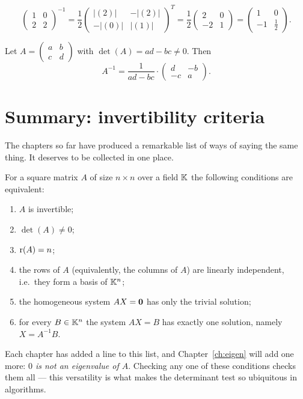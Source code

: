 \begin{example}
\[
\left ( \begin{array}{cc} 1 & 0 \\ 2 & 2 \end{array} \right )^{-1}
= \frac{1}{2} \left ( \begin{array}{cc}
|(2)| & -|(2)| \\ -|(0)| & |(1)|
\end{array} \right )^T
= \frac{1}{2} \left ( \begin{array}{cc} 2 & 0 \\ -2 & 1 \end{array} \right )
= \left ( \begin{array}{cc} 1 & 0 \\ -1 & \tfrac12 \end{array} \right ).
\]
\end{example}

\begin{fact}
Let $A= \left ( \begin{smallmatrix} a & b \\ c & d \end{smallmatrix} \right )$ with
$\det(A) = ad-bc \neq 0$. Then
\[
A^{-1} = \frac{1}{ad-bc}\cdot \left( \begin{array}{cc} d & -b \\ -c & a \end{array} \right ).
\]
\end{fact}

\section{Summary: invertibility criteria}

The chapters so far have produced a remarkable list of ways of saying the same thing. It deserves to be
collected in one place.

\begin{theorem}
For a square matrix $A$ of size $n\times n$ over a field $\mathbb{K}$ the following conditions are equivalent:
\begin{enumerate}
\item $A$ is invertible;
\item $\det(A)\neq 0$;
\item $\operatorname{r}(A) = n$;
\item the rows of $A$ (equivalently, the columns of $A$) are linearly independent, i.e.\ they form a basis
of $\mathbb{K}^n$;
\item the homogeneous system $AX = \mathbf{0}$ has only the trivial solution;
\item for every $B\in\mathbb{K}^n$ the system $AX = B$ has exactly one solution, namely $X = A^{-1}B$.
\end{enumerate}
\end{theorem}

\begin{remark}
Each chapter has added a line to this list, and Chapter~\ref{ch:eigen} will add one more: \emph{$0$ is not
an eigenvalue of $A$}. Checking any one of these conditions checks them all — this versatility is what
makes the determinant test so ubiquitous in algorithms.
\end{remark}
